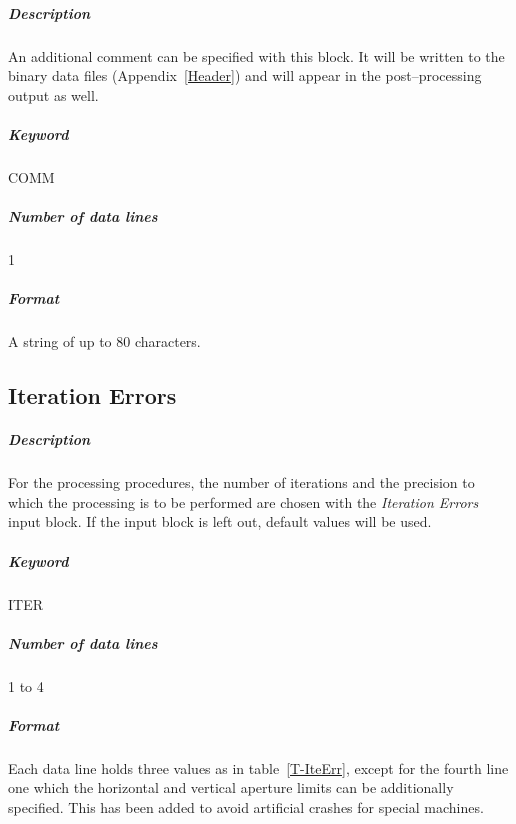 \documentclass[a4paper,11pt]{report}
\begin{document}
\subparagraph{Description} An additional comment can be specified with
this block.  It will be written to the binary data files
(Appendix~\ref{Header}) and will appear in the post--processing output
as well.

\subparagraph{Keyword} COMM \subparagraph{Number of data lines} 1

\subparagraph{Format} A string of up to 80 characters.

\subsection{Iteration Errors} \label{IteErr}

\subparagraph{Description} For the processing procedures, the number
of iterations and the precision to which the processing is to be
performed are chosen with the {\em Iteration Errors} \/input block.
If the input block is left out, default values will be used.

\subparagraph{Keyword} ITER \subparagraph{Number of data lines} 1 to 4

\subparagraph{Format} Each data line holds three values as in
table~\ref{T-IteErr}, except for the fourth line one which the horizontal
and vertical aperture limits can be additionally specified. This has
been added to avoid artificial crashes for special machines.
\end{document}
